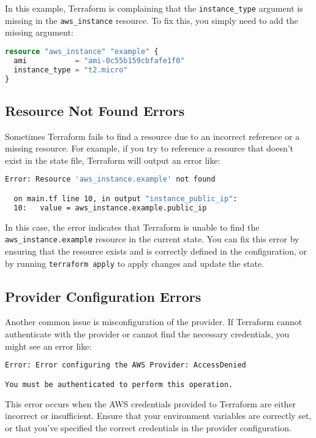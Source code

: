 In this example, Terraform is complaining that the \texttt{instance\_type} argument is missing in the \texttt{aws\_instance} resource. To fix this, you simply need to add the missing argument:

\begin{lstlisting}[language=terraform]
resource "aws_instance" "example" {
  ami           = "ami-0c55b159cbfafe1f0"
  instance_type = "t2.micro"
}
\end{lstlisting}

\subsection{Resource Not Found Errors}

Sometimes Terraform fails to find a resource due to an incorrect reference or a missing resource. For example, if you try to reference a resource that doesn't exist in the state file, Terraform will output an error like:

\begin{lstlisting}[language=bash]
Error: Resource 'aws_instance.example' not found

  on main.tf line 10, in output "instance_public_ip":
  10:   value = aws_instance.example.public_ip
\end{lstlisting}

In this case, the error indicates that Terraform is unable to find the \texttt{aws\_instance.example} resource in the current state. You can fix this error by ensuring that the resource exists and is correctly defined in the configuration, or by running \texttt{terraform apply} to apply changes and update the state.

\subsection{Provider Configuration Errors}

Another common issue is misconfiguration of the provider. If Terraform cannot authenticate with the provider or cannot find the necessary credentials, you might see an error like:

\begin{lstlisting}[language=bash]
Error: Error configuring the AWS Provider: AccessDenied

You must be authenticated to perform this operation.
\end{lstlisting}

This error occurs when the AWS credentials provided to Terraform are either incorrect or insufficient. Ensure that your environment variables are correctly set, or that you've specified the correct credentials in the provider configuration.


